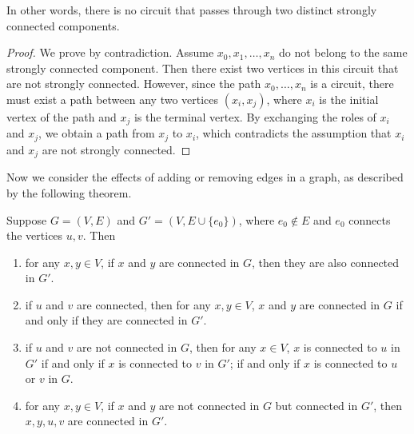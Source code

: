 In other words, there is no circuit that passes through two distinct strongly connected components. 

\begin{proof}
    We prove by contradiction. Assume $x_0,x_1,\dots,x_n$ do not belong to the same strongly connected component. Then there exist two vertices in this circuit that are not strongly connected. However, since the path $x_0,\dots,x_n$ is a circuit, there must exist a path between any two vertices $(x_i,x_j)$, where $x_i$ is the initial vertex of the path and $x_j$ is the terminal vertex. By exchanging the roles of $x_i$ and $x_j$, we obtain a path from $x_j$ to $x_i$, which contradicts the assumption that $x_i$ and $x_j$ are not strongly connected. 
\end{proof}

Now we consider the effects of adding or removing edges in a graph, as described by the following theorem. 

\begin{theorem}
    Suppose $G=(V,E)$ and $G'=(V,E\cup\{e_0\})$, where $e_0\not\in E$ and $e_0$ connects the vertices $u,v$. Then
    \begin{enumerate}[itemindent=0ex, itemsep=0pt, label=\upshape{(\alph*)}]
        \item for any $x,y\in V$, if $x$ and $y$ are connected in $G$, then they are also connected in $G'$. 
        \item if $u$ and $v$ are connected, then for any $x,y\in V$, $x$ and $y$ are connected in $G$ if and only if they are connected in $G'$. 
        \item if $u$ and $v$ are not connected in $G$, then for any $x\in V$, $x$ is connected to $u$ in $G'$ if and only if $x$ is connected to $v$ in $G'$; if and only if $x$ is connected to $u$ or $v$ in $G$. 
        \item for any $x,y\in V$, if $x$ and $y$ are not connected in $G$ but connected in $G'$, then $x,y,u,v$ are connected in $G'$. 
    \end{enumerate}
\end{theorem}

